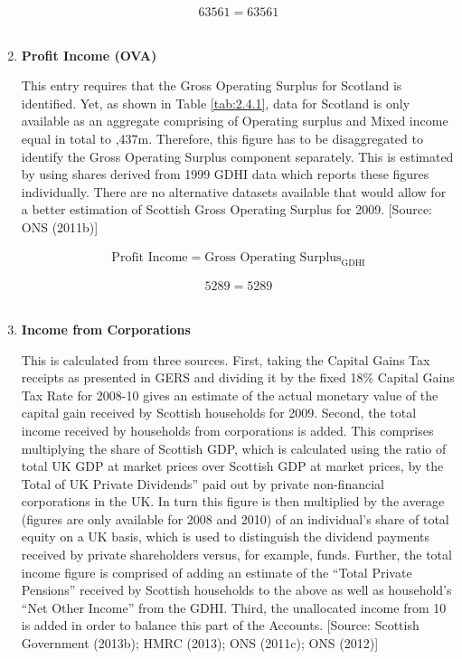 \begin{enumerate}
\begin{equation} \nonumber
63561 = 63561
\end{equation}\\

\item \textbf {Profit Income (OVA)}

This entry requires that the Gross Operating Surplus for Scotland is identified. Yet, as shown in Table \ref{tab:2.4.1}, data for Scotland is only available as an aggregate comprising of Operating surplus and Mixed income equal in total to ,437m. Therefore, this figure has to be disaggregated to identify the Gross Operating Surplus component separately. This is estimated by using shares derived from 1999 GDHI data which reports these figures individually. There are no alternative datasets available that would allow for a better estimation of Scottish Gross Operating Surplus for 2009. [Source: ONS (2011b)]

\begin{equation}
\begin{split}
\text{Profit Income} = \text{Gross Operating Surplus}_\text{GDHI}
\end{split} \label{eq:2.5.3}
\end{equation}

\begin{equation} \nonumber
5289 = 5289
\end{equation}\\


\item \textbf {Income from Corporations}

This is calculated from three sources. First, taking the Capital Gains Tax receipts as presented in GERS and dividing it by the fixed 18\% Capital Gains Tax Rate for 2008-10 gives an estimate of the actual monetary value of the capital gain received by Scottish households for 2009. 
Second, the total income received by households from corporations is added. This comprises multiplying the share of Scottish GDP, which is calculated using the ratio of total UK GDP at market prices over Scottish GDP at market prices, by the Total of UK Private Dividends” paid out by private non-financial corporations in the UK. In turn this figure is then multiplied by the average (figures are only available for 2008 and 2010) of an individual’s share of total equity on a UK basis, which is used to distinguish the dividend payments received by private shareholders versus, for example, funds. Further, the total income figure is comprised of adding an estimate of the “Total Private Pensions” received by Scottish households to the above as well as household’s “Net Other Income” from the GDHI. 
Third, the unallocated income from 10 is added in order to balance this part of the Accounts. [Source: Scottish Government (2013b); HMRC (2013); ONS (2011c); ONS (2012)] 



\end{enumerate}
